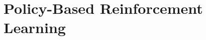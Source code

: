 \setcounter{chapter}{11}

\hypertarget{policy-based-reinforcement-learning}{%
\chapter{Policy-Based Reinforcement Learning}\label{policy-based-reinforcement-learning}}
